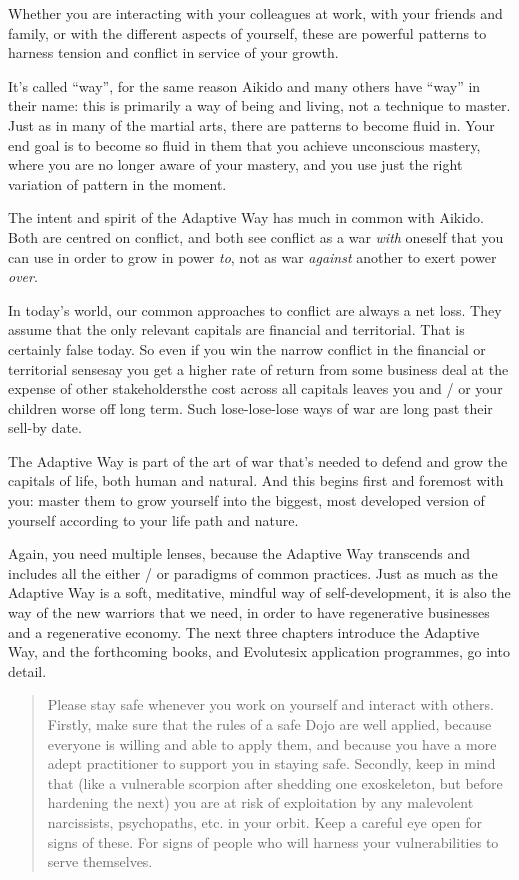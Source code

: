Whether you are interacting with your colleagues at work, with your friends and family, or with the different aspects of yourself, these are powerful patterns to harness tension and conflict in service of your growth. 


It’s called “way”, for the same reason Aikido and many others have “way” in their name: this is primarily a way of being and living, not a technique to master. Just as in many of the martial arts, there are patterns to become fluid in. Your end goal is to become so fluid in them that you achieve unconscious mastery, where you are no longer aware of your mastery, and you use just the right variation of pattern in the moment.


The intent and spirit of the Adaptive Way has much in common with Aikido. Both are centred on conflict, and both see conflict as a war \emph{with} oneself that you can use in order to grow in power \emph{to}, not as war \emph{against} another to exert power \emph{over}.


In today’s world, our common approaches to conflict  are always a net loss. They assume that the only relevant capitals are financial and territorial. That is certainly false today. So even if you win the narrow conflict in the financial or territorial sense\textemdash say you get a higher rate of return from some business deal at the expense of other stakeholders\textemdash the cost across all capitals leaves you and / or your children worse off long term. Such lose-lose-lose ways of war are long past their sell-by date. 


The Adaptive Way is part of the art of war that’s needed to defend and grow the capitals of life, both human and natural. And this begins first and foremost with you: master them to grow yourself into the biggest, most developed version of yourself according to your life path and nature. 


Again, you need multiple lenses, because the Adaptive Way transcends and includes all the either / or paradigms of common practices. Just as much as the Adaptive Way is a soft, meditative, mindful way of self-development, it is also the way of the new warriors that we need, in order to have regenerative businesses and a regenerative economy. The next three chapters introduce the Adaptive Way, and the forthcoming books, and Evolutesix application programmes, go into detail. 


\begin{quote}
Please stay safe whenever you work on yourself and interact with others. Firstly, make sure that the rules of a safe Dojo are well applied, because everyone is willing and able to apply them, and because you have a more adept practitioner to support you in staying safe. Secondly, keep in mind that (like a vulnerable scorpion after shedding one exoskeleton, but before hardening the next) you are at risk of exploitation by any malevolent narcissists, psychopaths, etc. in your orbit. Keep a careful eye open for signs of these. For signs of people who will harness your vulnerabilities to serve themselves.
\end{quote}